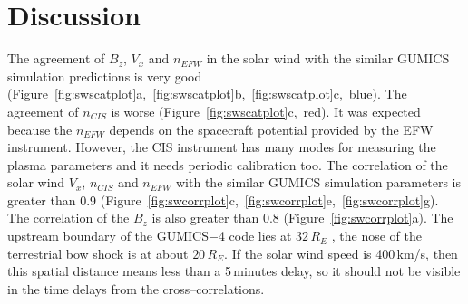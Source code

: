 \documentclass[b5paper,10pt]{article}
\begin{document}
\section{Discussion}
\label{sec:discussion}

The agreement of $B_{z}$, $V_{x}$ and $n_{EFW}$ in the solar wind with the similar GUMICS simulation predictions is very good (Figure~\ref{fig:swscatplot}a,~\ref{fig:swscatplot}b,~\ref{fig:swscatplot}c,~blue). The agreement of $n_{CIS}$ is worse (Figure~\ref{fig:swscatplot}c,~red). It was expected because the $n_{EFW}$ depends on the spacecraft potential provided by the EFW instrument. However, the CIS instrument has many modes for measuring the plasma parameters and it needs periodic calibration too. The correlation of the solar wind $V_{x}$, $n_{CIS}$ and $n_{EFW}$ with the similar GUMICS simulation parameters is greater than 0.9 (Figure~\ref{fig:swcorrplot}c,~\ref{fig:swcorrplot}e,~\ref{fig:swcorrplot}g). The correlation of the $B_{z}$ is also greater than 0.8 (Figure~\ref{fig:swcorrplot}a). The upstream boundary of the GUMICS$-$4 code lies at $32\,R_E$ \citep{janhunen12:_gumic_mhd}, the nose of the terrestrial bow shock is at about $20\,R_E$. If the solar wind speed is 400\,km/s, then this spatial distance means less than a 5\,minutes delay, so it should not be visible in the time delays from the cross--correlations. %
\end{document}
